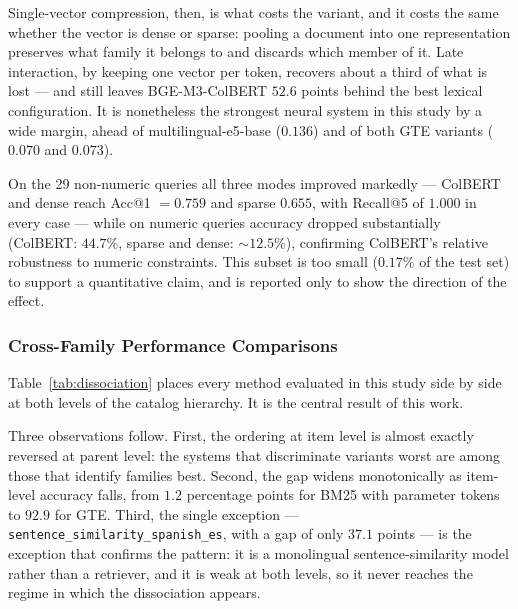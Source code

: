 \documentclass[preprint,12pt]{elsarticle}
\begin{document}
Single-vector compression, then, is what costs the variant, and it costs the same whether the vector is dense or sparse: pooling a document into one representation preserves what family it belongs to and discards which member of it. Late interaction, by keeping one vector per token, recovers about a third of what is lost --- and still leaves BGE-M3-ColBERT $52.6$ points behind the best lexical configuration. It is nonetheless the strongest neural system in this study by a wide margin, ahead of multilingual-e5-base ($0.136$) and of both GTE variants ($0.070$ and $0.073$).

On the 29 non-numeric queries all three modes improved markedly --- ColBERT and dense reach Acc@1 $=0.759$ and sparse $0.655$, with Recall@5 of $1.000$ in every case --- while on numeric queries accuracy dropped substantially (ColBERT: $44.7\%$, sparse and dense: ${\sim}12.5\%$), confirming ColBERT's relative robustness to numeric constraints. This subset is too small ($0.17\%$ of the test set) to support a quantitative claim, and is reported only to show the direction of the effect.

\subsubsection{Cross-Family Performance Comparisons}
\label{subsec:cross_family}

Table~\ref{tab:dissociation} places every method evaluated in this study side by side at both levels of the catalog hierarchy. It is the central result of this work.



Three observations follow. First, the ordering at item level is almost exactly reversed at parent level: the systems that discriminate variants worst are among those that identify families best. Second, the gap widens monotonically as item-level accuracy falls, from $1.2$ percentage points for BM25 with parameter tokens to $92.9$ for GTE. Third, the single exception --- \texttt{sentence\_similarity\_spanish\_es}, with a gap of only $37.1$ points --- is the exception that confirms the pattern: it is a monolingual sentence-similarity model rather than a retriever, and it is weak at both levels, so it never reaches the regime in which the dissociation appears.
\end{document}
